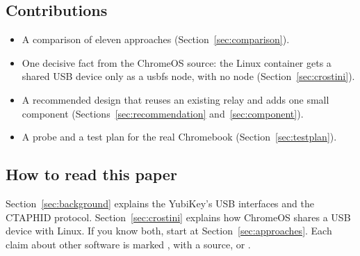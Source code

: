 \subsection{Contributions}

\begin{itemize}
\item A comparison of eleven approaches (Section~\ref{sec:comparison}).
\item One decisive fact from the ChromeOS source: the Linux container gets a
      shared USB device only as a usbfs node, with no  node
      (Section~\ref{sec:crostini}).
\item A recommended design that reuses an existing relay and adds one small
      component (Sections~\ref{sec:recommendation} and~\ref{sec:component}).
\item A probe and a test plan for the real Chromebook
      (Section~\ref{sec:testplan}).
\end{itemize}

\subsection{How to read this paper}

Section~\ref{sec:background} explains the YubiKey's USB interfaces and the
CTAPHID protocol. Section~\ref{sec:crostini} explains how ChromeOS shares a
USB device with Linux. If you know both, start at
Section~\ref{sec:approaches}. Each claim about other software is marked
, with a source, or .
